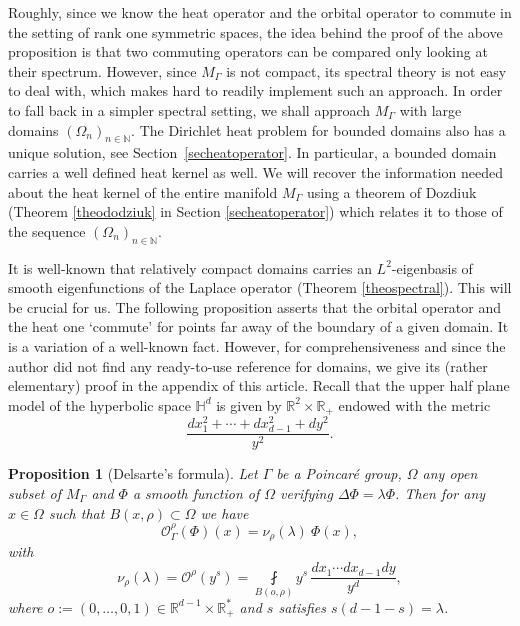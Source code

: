 \documentclass[10pt]{amsart}
\let\mathcal\mathscr
\theoremstyle{plain}
\newtheorem{proposition}[equation]{Proposition}
\theoremstyle{definition}
\newcommand{\RR}{\mathbb{R}}
\newcommand{\NN}{\mathbb{N}}
\newcommand{\finte}[3]{\underset{#1}{\fint} {#2} \, {#3}}
\begin{document}
Roughly, since we know the heat operator and the orbital operator to commute in the setting of rank one symmetric spaces, the idea behind the proof of the above proposition is that two commuting operators can be compared only looking at their spectrum. However, since $M_{\Gamma}$ is not compact, its spectral theory is not easy to deal with, which makes hard to readily implement such an approach. In order to fall back in a simpler spectral setting, we shall approach $M_{\Gamma}$ with large domains $(\Omega_n)_{n \in \NN}$. The Dirichlet heat problem for bounded domains also has a unique solution, see Section~\ref{secheatoperator}. In particular, a bounded domain carries a well defined heat kernel as well. We will recover the information needed about the heat kernel of the entire manifold $M_{\Gamma}$ using a theorem of Dozdiuk (Theorem \ref{theododziuk} in Section \ref{secheatoperator}) which relates it to those of the sequence $(\Omega_n)_{n \in \NN}$.

It is well-known that relatively compact domains carries an $L^2$-eigenbasis of smooth eigenfunctions of the Laplace operator (Theorem \ref{theospectral}). This will be crucial for us. The following proposition asserts that the orbital operator and the heat one `commute' for points far away of the boundary of a given domain. It is a variation of a well-known fact. However, for comprehensiveness and since the author did not find any ready-to-use reference for domains, we give its (rather elementary) proof in the appendix of this article. Recall that the upper half plane model of the hyperbolic space $\mathbb{H}^d$ is given by $\RR^{2} \times \RR_+$ endowed with the metric
\[
\frac{dx^2_1 +\cdots + dx^2_{d-1} + dy^2}{y^{2}}.
\]
\begin{proposition}[Delsarte's formula]
\label{propselbergtransform}
Let $\Gamma$ be a Poincaré group, $\Omega$ any open subset of $M_{\Gamma}$ and $\Phi$ a smooth function of $\Omega$ verifying $\Delta \Phi = \lambda \Phi$. Then for any $x \in \Omega$ such that $B(x,\rho) \subset \Omega$ we have
\begin{equation*}
\mathcal{O}_{\Gamma}^{\rho}(\Phi)(x) = \nu_{\rho}(\lambda) \ \Phi(x),
\end{equation*}
with
\begin{equation}
\label{eqformuleexplicit}
\nu_{\rho}(\lambda) = \mathcal{O}^{\rho}(y^s) = \finte{B(o,\rho)}{ y^s}{ \frac{dx_1\cdots dx_{d-1} dy}{y^d}},
\end{equation}
where $o := (0,\dots, 0, 1) \in \RR^{d-1} \times \RR_+^*$ and $s$ satisfies $s(d-1-s) = \lambda$.
\end{proposition}
\end{document}

